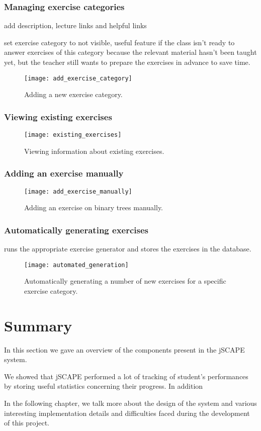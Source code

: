\subsubsection{Managing exercise categories}
add description, lecture links and helpful links

set exercise category to not visible, useful feature if the class isn't ready to answer exercises of this category because the relevant material hasn't been taught yet, but the teacher still wants to prepare the exercises in advance to save time.

\begin{figure}[H]
\centering
\texttt{[image: add\_exercise\_category]}
\caption{Adding a new exercise category.}
\label{fig:add_exercise_category}
\end{figure}

\subsubsection{Viewing existing exercises}
\begin{figure}[H]
\centering
\texttt{[image: existing\_exercises]}
\caption{Viewing information about existing exercises.}
\label{fig:existing_exercises}
\end{figure}

\subsubsection{Adding an exercise manually}
\begin{figure}[H]
\centering
\texttt{[image: add\_exercise\_manually]}
\caption{Adding an exercise on binary trees manually.}
\label{fig:add_exercise_manually}
\end{figure}

\subsubsection{Automatically generating exercises}
runs the appropriate exercise generator and stores the exercises in the database.
\begin{figure}[H]
\centering
\texttt{[image: automated\_generation]}
\caption{Automatically generating a number of new exercises for a specific exercise category.}
\label{fig:automated_generation}
\end{figure}



\section{Summary}
In this section we gave an overview of the components present in the jSCAPE system. 

We showed that jSCAPE performed a lot of tracking of student's performances by storing useful statistics concerning their progress. In addition\newline

In the following chapter, we talk more about the design of the system and various interesting implementation details and difficulties faced during the development of this project.

